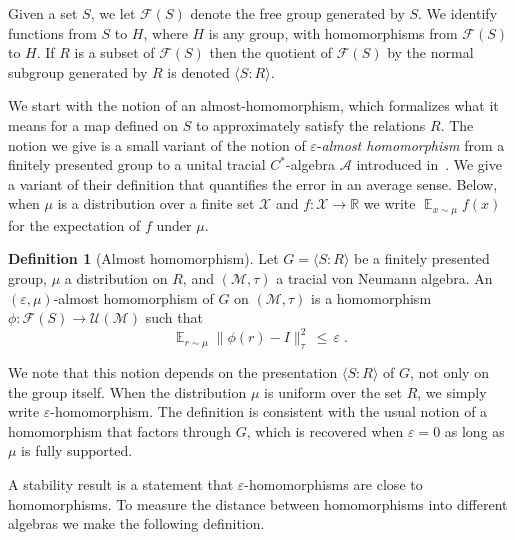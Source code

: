\documentclass[11pt]{article}
\theoremstyle{definition}
\newtheorem{definition}[theorem]{Definition}
\newcommand{\Id}{\ensuremath{I}}
\DeclareMathOperator*{\Expectation}{\mathbb{E}}
\newcommand{\Es}[1]{\Expectation_{#1}}
\newcommand{\R}{\ensuremath{\mathbb{R}}}
\newcommand{\mA}{\ensuremath{\mathcal{A}}}
\newcommand{\mF}{\ensuremath{\mathcal{F}}}
\newcommand{\mM}{\ensuremath{\mathcal{M}}}
\newcommand{\mU}{\ensuremath{\mathcal{U}}}
\newcommand{\mX}{\ensuremath{\mathcal{X}}}
\newcommand{\eps}{\varepsilon}
\begin{document}
Given a set $S$, we let $\mF(S)$ denote the free group generated by $S$. We identify functions from $S$ to $H$, where $H$ is any group, with homomorphisms from $\mF(S)$ to $H$. If $R$ is a subset of $\mF(S)$ then the quotient of $\mF(S)$ by the normal subgroup generated by $R$ is denoted $\langle S:R\rangle$. 

We start with the notion of an almost-homomorphism, which formalizes what it means for a map defined on $S$ to approximately satisfy the relations $R$. The notion we give is a small variant of the notion of $\eps$-\emph{almost homomorphism} from a finitely presented group to a unital tracial $C^*$-algebra $\mA$ introduced in~\cite[Section 2]{hadwin2018stability}. %
We give a variant of their definition that quantifies the error in an average sense. Below, when $\mu$ is a distribution over a finite set $\mX$ and $f:\mX\to \R$ we write $\Es{x\sim \mu} f(x)$ for the expectation of $f$ under $\mu$. 

\begin{definition}[Almost homomorphism]\label{def:approx-hom}
Let $G = \langle S:R\rangle $ be a finitely presented group, $\mu$ a distribution on $R$, and $(\mM,\tau)$ a tracial von Neumann algebra. An $(\eps,\mu)$-almost homomorphism of $G$ on $(\mM,\tau)$ is a homomorphism $\phi:\mF(S)\to\mU(\mM)$ such that
\[ \Es{r\sim \mu} \big\|  \phi(r) - \Id \big \|_\tau^2 \,\leq\, \eps\;.\]
\end{definition}

We note that this notion depends on the presentation $\langle S:R\rangle$ of $G$, not only on the group itself. 
When the distribution $\mu$ is uniform over the set $R$, we simply write $\eps$-homomorphism. The definition is consistent with the usual notion of a homomorphism that factors through $G$, which is recovered when $\eps=0$ as long as $\mu$ is fully supported. 

A stability result is a statement that $\eps$-homomorphisms are close to homomorphisms. To measure the distance between homomorphisms into different algebras we make the following definition. 
\end{document}
